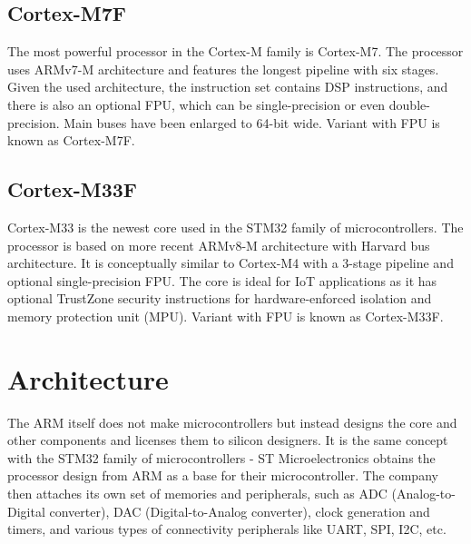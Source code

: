 	\subsection{Cortex-M7F}
	\label{sub:stm_m7}
The most powerful processor in the Cortex-M family is Cortex-M7. The processor uses ARMv7-M architecture and features the longest pipeline with six stages. Given the used architecture, the instruction set contains DSP instructions, and there is also an optional FPU, which can be single-precision or even double-precision. Main buses have been enlarged to 64-bit wide. Variant with FPU is known as Cortex-M7F. 
	
	\subsection{Cortex-M33F}
	\label{sub:stm_m33}
Cortex-M33 is the newest core used in the STM32 family of microcontrollers. The processor is based on more recent ARMv8-M architecture with Harvard bus architecture. It is conceptually similar to Cortex-M4 with a 3-stage pipeline and optional single-precision FPU. The core is ideal for IoT applications as it has optional TrustZone security instructions for hardware-enforced isolation and memory protection unit (MPU). Variant with FPU is known as Cortex-M33F. 

\section{Architecture}
\label{sec:stm_arch}
The ARM itself does not make microcontrollers but instead designs the core and other components and licenses them to silicon designers. It is the same concept with the STM32 family of microcontrollers - ST Microelectronics obtains the processor design from ARM as a base for their microcontroller. The company then attaches its own set of memories and peripherals, such as ADC (Analog-to-Digital converter), DAC (Digital-to-Analog converter), clock generation and timers, and various types of connectivity peripherals like UART, SPI, I2C, etc.


